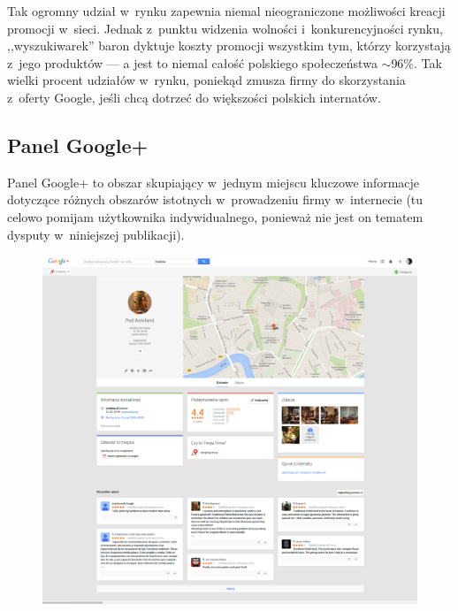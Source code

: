 Tak ogromny udział w~rynku zapewnia niemal nieograniczone możliwości kreacji promocji w~sieci. Jednak z~punktu widzenia wolności i~konkurencyjności rynku, ,,wyszukiwarek'' baron dyktuje koszty promocji wszystkim tym, którzy korzystają z~jego produktów --- a jest to niemal całość polskiego społeczeństwa $\sim$96\%. Tak wielki procent udziałów w~rynku, poniekąd zmusza firmy do skorzystania z~oferty Google, jeśli chcą dotrzeć do większości polskich internatów. \\

\lipsum[18-26]

\subsection{Panel Google+}
Panel Google+ to obszar skupiający w~jednym miejscu kluczowe informacje dotyczące różnych obszarów istotnych w~prowadzeniu firmy w~internecie (tu celowo pomijam użytkownika indywidualnego, ponieważ nie jest on tematem dysputy w~niniejszej publikacji).\\

\begin{figure}[!h]
\centering
    \scalebox{0.21}
    {
        \includegraphics{images/pod-aniolami-google-plus.png}
    }
    \label{fig:sample-google-plus-company-profile-page}
\end{figure}


